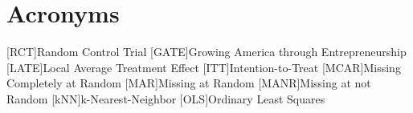 
\section*{Acronyms}
\begin{acronym}
	[RCT]{Random Control Trial}
	[GATE]{Growing America through Entrepreneurship}
      	[LATE]{Local Average Treatment Effect}
	[ITT]{Intention-to-Treat}
	[MCAR]{Missing Completely at Random}
	[MAR]{Missing at Random}
	[MANR]{Missing at not Random}
	[kNN]{k-Nearest-Neighbor}
	[OLS]{Ordinary Least Squares}
\end{acronym}
